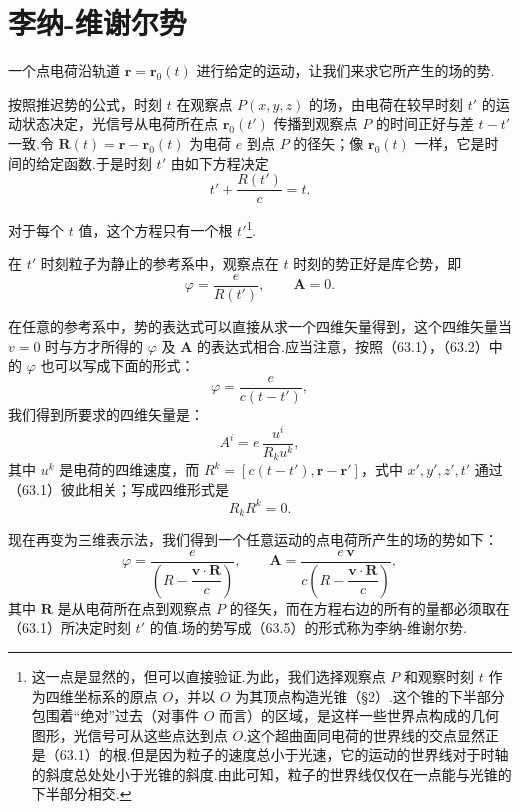 \section{李纳-维谢尔势}

一个点电荷沿轨道 $\boldsymbol{r}=\boldsymbol{r}_0(t)$ 进行给定的运动，让我们来求它所产生的场的势.

按照推迟势的公式，时刻 $t$ 在观察点 $P(x,y,z)$ 的场，由电荷在较早时刻 $t'$ 的运动状态决定，光信号从电荷所在点 $\boldsymbol{r}_0(t')$ 传播到观察点 $P$ 的时间正好与差 $t-t'$ 一致.令 $\boldsymbol{R}(t)=\boldsymbol{r}-\boldsymbol{r}_0(t)$ 为电荷 $e$ 到点 $P$ 的径矢；像 $\boldsymbol{r}_0(t)$ 一样，它是时间的给定函数.于是时刻 $t'$ 由如下方程决定
\begin{equation}
  t'+\frac{R(t')}{c}=t.
\end{equation}

对于每个 $t$ 值，这个方程只有一个根 $t'$\footnote{这一点是显然的，但可以直接验证.为此，我们选择观察点 $P$ 和观察时刻 $t$ 作为四维坐标系的原点 $O$，并以 $O$ 为其顶点构造光锥（§2）.这个锥的下半部分包围着“绝对”过去（对事件 $O$ 而言）的区域，是这样一些世界点构成的几何图形，光信号可从这些点达到点 $O$.这个超曲面同电荷的世界线的交点显然正是（63.1）的根.但是因为粒子的速度总小于光速，它的运动的世界线对于时轴的斜度总处处小于光锥的斜度.由此可知，粒子的世界线仅仅在一点能与光锥的下半部分相交.}.

在 $t'$ 时刻粒子为静止的参考系中，观察点在 $t$ 时刻的势正好是库仑势，即
\begin{equation}
  \varphi=\frac{e}{R(t')},\qquad \boldsymbol{A}=0.
\end{equation}

在任意的参考系中，势的表达式可以直接从求一个四维矢量得到，这个四维矢量当 $v=0$ 时与方才所得的 $\varphi$ 及 $\boldsymbol{A}$ 的表达式相合.应当注意，按照（63.1），（63.2）中的 $\varphi$ 也可以写成下面的形式：
\begin{equation*}
  \varphi=\frac{e}{c(t-t')},
\end{equation*}
我们得到所要求的四维矢量是：
\begin{equation}
  A^i=e\,\frac{u^i}{R_ku^k},
\end{equation}
其中 $u^k$ 是电荷的四维速度，而 $R^k=[c(t-t'),\boldsymbol{r}-\boldsymbol{r}']$，式中 $x',y',z',t'$ 通过（63.1）彼此相关；写成四维形式是
\begin{equation}
  R_kR^k=0.
\end{equation}

现在再变为三维表示法，我们得到一个任意运动的点电荷所产生的场的势如下：
\begin{equation}
  \varphi=\frac{e}{\left(R-\dfrac{\boldsymbol{v}\cdot\boldsymbol{R}}{c}\right)},\qquad
  \boldsymbol{A}=\frac{e\,\boldsymbol{v}}{c\left(R-\dfrac{\boldsymbol{v}\cdot\boldsymbol{R}}{c}\right)},
\end{equation}
其中 $\boldsymbol{R}$ 是从电荷所在点到观察点 $P$ 的径矢，而在方程右边的所有的量都必须取在（63.1）所决定时刻 $t'$ 的值.场的势写成（63.5）的形式称为李纳-维谢尔势.

